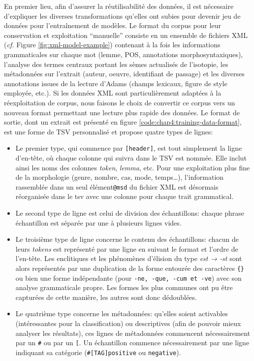 En premier lieu, afin d'assurer la réutilisabilité des données, il est nécessaire d'expliquer les diverses transformations qu'elles ont subies pour devenir jeu de données pour l'entraînement de modèles. Le format du corpus pour leur conservation et exploitation \enquote{manuelle} consiste en un ensemble de fichiers XML (\textit{cf.} Figure \ref{fig:xml-model-example}) contenant à la fois les informations grammaticales sur chaque mot (lemme, POS, annotations morphosyntaxiques), l'analyse des termes centraux portant les sèmes actualisés de l'isotopie, les métadonnées sur l'extrait (auteur, oeuvre, identifiant de passage) et les diverses annotations issues de la lecture d'Adams (champs lexicaux, figure de style employée, etc.). Si les données XML sont particulièrement adaptées à la réexploitation de corpus, nous faisons le choix de convertir ce corpus vers un nouveau format permettant une lecture plus rapide des données. Le format de sortie, dont un extrait est présenté en figure \ref{code:chap4:training-data-format}, est une forme de TSV personnalisé et propose quatre types de lignes:
\begin{itemize}
    \item Le premier type, qui commence par \texttt{[header]}, est tout simplement la ligne d'en-tête, où chaque colonne qui suivra dans le TSV est nommée. Elle inclut ainsi les noms des colonnes \textit{token}, \textit{lemma}, etc. Pour une exploitation plus fine de la morphologie (genre, nombre, cas, mode, temps…), l'information rassemblée dans un seul élément\texttt{@msd} du fichier XML est désormais réorganisée dans le tsv avec une colonne pour chaque trait grammatical.
    \item Le second type de ligne est celui de division des échantillons: chaque phrase échantillon est séparée par une à plusieurs lignes vides.
    \item Le troisième type de ligne concerne le contenu des échantillons: chacun de leurs \textit{tokens} est représenté par une ligne en suivant le format et l'ordre de l'en-tête. Les enclitiques et les phénomènes d'élision du type \textit{est → -st} sont alors représentés par une duplication de la forme entourée des caractères \texttt{\{\}} ou bien une forme indépendante (pour \texttt{-ne, -que, -cum et -ve}) avec son analyse grammaticale propre. Les formes les plus communes ont pu être capturées de cette manière, les autres sont donc dédoublées.
    \item Le quatrième type concerne les métadonnées: qu'elles soient activables (intéressantes pour la classification) ou descriptives (afin de pouvoir mieux analyser les résultats), ces lignes de métadonnées commencent nécessairement par un \texttt{\#} ou par un \texttt{[}. Un échantillon commence nécessairement par une ligne indiquant sa catégorie (\texttt{\#[TAG]positive} ou \texttt{negative}). 
\end{itemize}

